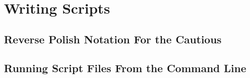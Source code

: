 \chapter{Writing Scripts}
\label{writingScripts}

\section{Reverse Polish Notation For the Cautious}
\label{polishNotation}

\section{Running Script Files From the Command Line}
\label{useCLI}
